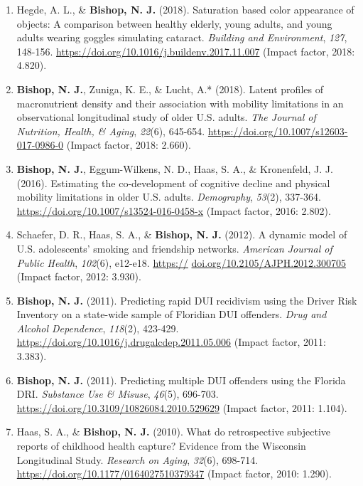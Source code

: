 \documentclass[
]{article}
\begin{document}
\begin{enumerate}
{  Mobile Technology in Medicine}, \emph{7}(3), 7-16.
  \url{http://dx.doi.org/10.7309/jmtm.7.2.2} (Impact factor: NA).
\item
  Hegde, A. L., \& \textbf{Bishop, N. J.} (2018). Saturation based color
  appearance of objects: A comparison between healthy elderly, young
  adults, and young adults wearing goggles simulating cataract.
  \emph{Building and Environment}, \emph{127}, 148-156.
  \url{https://doi.org/10.1016/j.buildenv.2017.11.007} (Impact factor,
  2018: 4.820).
\item
  \textbf{Bishop, N. J.}, Zuniga, K. E., \& Lucht, A.* (2018). Latent
  profiles of macronutrient density and their association with mobility
  limitations in an observational longitudinal study of older U.S.
  adults. \emph{The Journal of Nutrition, Health, \& Aging},
  \emph{22}(6), 645-654. \url{https://doi.org/10.1007/s12603-017-0986-0}
  (Impact factor, 2018: 2.660).
\item
  \textbf{Bishop, N. J.}, Eggum-Wilkens, N. D., Haas, S. A., \&
  Kronenfeld, J. J. (2016). Estimating the co-development of cognitive
  decline and physical mobility limitations in older U.S. adults.
  \emph{Demography}, \emph{53}(2), 337-364.
  \url{https://doi.org/10.1007/s13524-016-0458-x} (Impact factor, 2016:
  2.802).
\item
  Schaefer, D. R., Haas, S. A., \& \textbf{Bishop, N. J.} (2012). A
  dynamic model of U.S. adolescents' smoking and friendship networks.
  \emph{American Journal of Public Health}, \emph{102}(6), e12-e18.
  \href{https://}{\uline{https://}}
  \href{https://doi.org/10.2105/AJPH.2012.300705}{doi.org/10.2105/AJPH.2012.300705}
  (Impact factor, 2012: 3.930).
\item
  \textbf{Bishop, N. J.} (2011). Predicting rapid DUI recidivism using
  the Driver Risk Inventory on a state-wide sample of Floridian DUI
  offenders. \emph{Drug and Alcohol Dependence}, \emph{118}(2), 423-429.
  \url{https://doi.org/10.1016/j.drugalcdep.2011.05.006} (Impact factor,
  2011: 3.383).
\item
  \textbf{Bishop, N. J.} (2011). Predicting multiple DUI offenders using
  the Florida DRI. \emph{Substance Use \& Misuse}, \emph{46}(5),
  696-703. \url{https://doi.org/10.3109/10826084.2010.529629} (Impact
  factor, 2011: 1.104).
\item
  Haas, S. A., \& \textbf{Bishop, N. J.} (2010). What do retrospective
  subjective reports of childhood health capture? Evidence from the
  Wisconsin Longitudinal Study. \emph{Research on Aging}, \emph{32}(6),
  698-714. \url{https://doi.org/10.1177/0164027510379347} (Impact
  factor, 2010: 1.290).
\end{enumerate}
\end{document}

